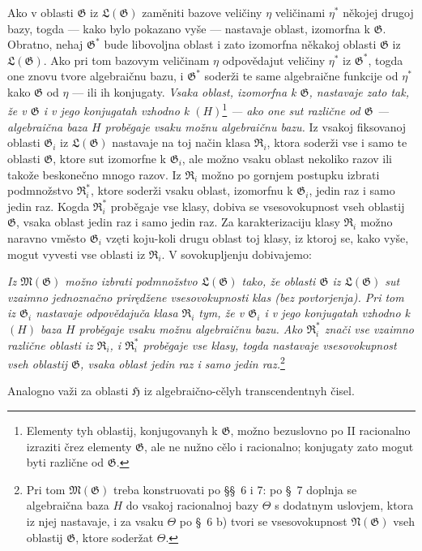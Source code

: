 \documentclass[11pt]{article}
\begin{document}
Ako v oblasti $\mathfrak G$ iz $\mathfrak L(\mathfrak G)$ zaměniti bazove
veličiny $\eta$ veličinami $\eta^*$ někojej drugoj bazy, togda --- kako bylo
pokazano vyše --- nastavaje oblast, izomorfna k $\mathfrak G$. Obratno, nehaj
$\mathfrak G^*$ bude libovoljna oblast i zato izomorfna někakoj oblasti
$\mathfrak G$ iz $\mathfrak L(\mathfrak G)$. Ako pri tom bazovym veličinam
$\eta$ odpovědajut veličiny $\eta^*$ iz $\mathfrak G^*$, togda one znovu
tvore algebraičnu bazu, i $\mathfrak G^*$ soderži te same algebraične funkcije
od $\eta^*$ kako $\mathfrak G$ od $\eta$ --- ili ih konjugaty. {\itshape Vsaka
oblast, izomorfna k $\mathfrak G$, nastavaje zato tak, že v $\mathfrak G$ i v
jego konjugatah vzhodno k $(H)$}\footnote{Elementy tyh oblastij, konjugovanyh
k $\mathfrak G$, možno bezuslovno po II racionalno izraziti črez elementy
$\mathfrak G$, ale ne nužno cělo i racionalno; konjugaty zato mogut byti
različne od $\mathfrak G$.} {\itshape --- ako one sut različne od
$\mathfrak G$ --- algebraična baza $H$ proběgaje vsaku možnu algebraičnu bazu.}
Iz vsakoj fiksovanoj oblasti $\mathfrak G_i$ iz $\mathfrak L(\mathfrak G)$
nastavaje na toj način klasa $\mathfrak R_i$, ktora soderži vse i samo te
oblasti $\mathfrak G$, ktore sut izomorfne k $\mathfrak G_i$, ale možno vsaku
oblast nekoliko razov ili takože beskonečno mnogo razov. Iz
$\mathfrak R_i$ možno po gornjem postupku izbrati podmnožstvo
$\mathfrak R_i^*$, ktore soderži vsaku oblast, izomorfnu k
$\mathfrak G_i$, jedin raz i samo jedin raz. Kogda $\mathfrak R_i^*$ proběgaje
vse klasy, dobiva se vsesovokupnost vseh oblastij $\mathfrak G$, vsaka oblast
jedin raz i samo jedin raz. Za karakterizaciju klasy $\mathfrak R_i$ možno
naravno vměsto $\mathfrak G_i$ vzęti koju-koli drugu oblast toj klasy, iz ktoroj
se, kako vyše, mogut vyvesti vse oblasti iz $\mathfrak R_i$. V sovokupljenju
dobivajemo:

{\itshape Iz $\mathfrak M(\mathfrak G)$ možno izbrati podmnožstvo
$\mathfrak L(\mathfrak G)$ tako, že oblasti $\mathfrak G$ iz
$\mathfrak L(\mathfrak G)$ sut vzaimno jednoznačno prirędžene vsesovokupnosti
klas (bez povtorjenja). Pri tom iz $\mathfrak G_i$ nastavaje odpovědajuča klasa
$\mathfrak R_i$ tym, že v $\mathfrak G_i$ i v jego konjugatah vzhodno k
$(H)$ baza $H$ proběgaje vsaku možnu algebraičnu bazu. Ako
$\mathfrak R_i^*$ znači vse vzaimno različne oblasti iz $\mathfrak R_i$, i
$\mathfrak R_i^*$ proběgaje vse klasy, togda nastavaje vsesovokupnost vseh
oblastij $\mathfrak G$, vsaka oblast jedin raz i samo jedin raz.}\footnote{Pri
tom $\mathfrak M(\mathfrak G)$ treba konstruovati po \S\S\ 6 i 7: po \S\ 7
doplnja se algebraična baza $H$ do vsakoj racionalnoj bazy $\Theta$ s dodatnym
uslovjem, ktora iz njej nastavaje, i za vsaku $\Theta$ po \S\ 6 b) tvori se
vsesovokupnost $\mathfrak N(\mathfrak G)$ vseh oblastij $\mathfrak G$, ktore
soderžat $\Theta$.}

Analogno važi za oblasti $\mathfrak H$ iz algebraično-cělyh transcendentnyh
čisel.
\end{document}

